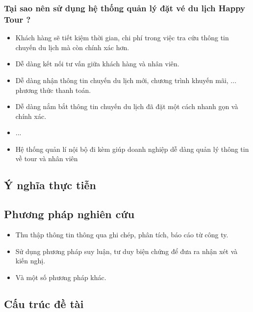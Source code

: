\subsubsection{Tại sao nên sử dụng hệ thống quản lý đặt vé du lịch Happy Tour ?}

\begin{itemize}
\item Khách hàng sẽ tiết kiệm thời gian, chi phí trong việc tra cứu thông tin chuyến du lịch mà còn chính xác hơn.
\item Dễ dàng kết nối tư vấn giữa khách hàng và nhân viên.
\item Dễ dàng nhận thông tin chuyến du lịch mới, chương trình khuyến mãi, ... phương thức thanh toán.
\item Dễ dàng nắm bắt thông tin chuyến du lịch đã đặt một cách nhanh gọn và chính xác.
\item ...
\item Hệ thống quản lí nội bộ đi kèm giúp doanh nghiệp dễ dàng quản lý thông tin về tour và nhân viên
\end{itemize}

\subsection{Ý nghĩa thực tiễn}


\subsection{Phương pháp nghiên cứu}


\begin{itemize}
\item Thu thập thông tin thông qua ghi chép, phân tích, báo cáo từ công ty.
\item Sử dụng phương pháp suy luận, tư duy biện chứng để đưa ra nhận xét và kiến nghị.
\item Và một số phương pháp khác.
\end{itemize}

\subsection{Cấu trúc đề tài}

